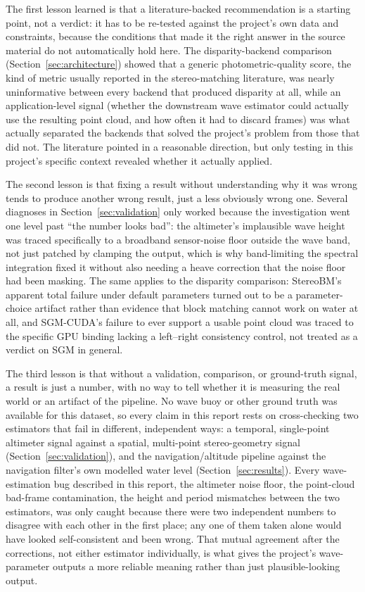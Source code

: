 \label{sec:lessons}

The first lesson learned is that a literature-backed recommendation is a starting point, not a verdict: it has to be re-tested against the project's own data and constraints, because the conditions that made it the right answer in the source material do not automatically hold here. The disparity-backend comparison (Section~\ref{sec:architecture}) showed that a generic photometric-quality score, the kind of metric usually reported in the stereo-matching literature, was nearly uninformative between every backend that produced disparity at all, while an application-level signal (whether the downstream wave estimator could actually use the resulting point cloud, and how often it had to discard frames) was what actually separated the backends that solved the project's problem from those that did not. The literature pointed in a reasonable direction, but only testing in this project's specific context revealed whether it actually applied.

The second lesson is that fixing a result without understanding why it was wrong tends to produce another wrong result, just a less obviously wrong one. Several diagnoses in Section~\ref{sec:validation} only worked because the investigation went one level past ``the number looks bad'': the altimeter's implausible wave height was traced specifically to a broadband sensor-noise floor outside the wave band, not just patched by clamping the output, which is why band-limiting the spectral integration fixed it without also needing a heave correction that the noise floor had been masking. The same applies to the disparity comparison: StereoBM's apparent total failure under default parameters turned out to be a parameter-choice artifact rather than evidence that block matching cannot work on water at all, and SGM-CUDA's failure to ever support a usable point cloud was traced to the specific GPU binding lacking a left--right consistency control, not treated as a verdict on SGM in general.

The third lesson is that without a validation, comparison, or ground-truth signal, a result is just a number, with no way to tell whether it is measuring the real world or an artifact of the pipeline. No wave buoy or other ground truth was available for this dataset, so every claim in this report rests on cross-checking two estimators that fail in different, independent ways: a temporal, single-point altimeter signal against a spatial, multi-point stereo-geometry signal (Section~\ref{sec:validation}), and the navigation/altitude pipeline against the navigation filter's own modelled water level (Section~\ref{sec:results}). Every wave-estimation bug described in this report, the altimeter noise floor, the point-cloud bad-frame contamination, the height and period mismatches between the two estimators, was only caught because there were two independent numbers to disagree with each other in the first place; any one of them taken alone would have looked self-consistent and been wrong. That mutual agreement after the corrections, not either estimator individually, is what gives the project's wave-parameter outputs a more reliable meaning rather than just plausible-looking output.